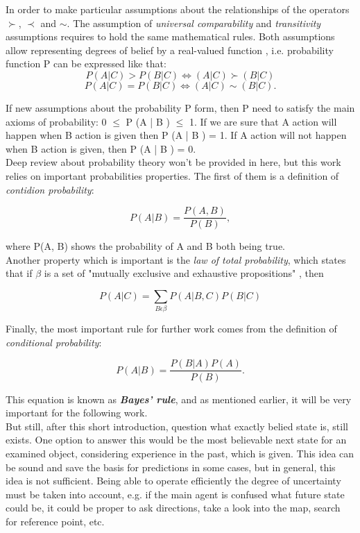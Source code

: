 In order to make particular assumptions about the relationships of the operators $\succ$, $\prec$ and $\sim$. The assumption of \textit{universal comparability} and \textit{transitivity} assumptions requires to hold the same mathematical rules. Both assumptions allow representing degrees of belief by a real-valued function \cite{BOOK}, i.e. probability function P can be expressed like that:
\[ P(A|C) > P(B|C) \iff (A|C) \succ (B|C) \]
\[P(A|C) = P(B|C) \iff (A|C) \sim (B|C). \]

If new assumptions about the probability P form, then P need to satisfy the main axioms of probability: 0 $\leqslant$ P (A | B ) $\leqslant$ 1. If we are sure that A action will happen when B action is given then P (A | B ) = 1. If A action will not happen when B action is given, then
P (A | B ) = 0. \\

Deep review about probability theory won't be provided in here, but this work relies on important probabilities properties. The first of them is a definition of \textit{contidion probability}:

\begin{equation}
P(A|B)=\frac{P(A,B)}{P(B)},
\end{equation}

where P(A, B) shows the probability of A and B both being true. \\

Another property which is important is the \textit{law of total probability}, which states that if $\beta$ is a set of "mutually exclusive and exhaustive propositions" \cite{BOOK}, then

\begin{equation}
P(A|C)=\displaystyle \sum_{B \epsilon \beta}{P(A|B,C)P(B|C)}
\end{equation}

Finally, the most important rule for further work comes from the definition of \textit{conditional probability}:

\begin{equation}
P(A|B)=\frac{P(B|A)P(A)}{P(B)}.
\end{equation}

This equation is known as \textbf{\textit{Bayes’ rule}}, and as mentioned earlier, it will be very important for the following work. \\

But still, after this short introduction, question what exactly belied state is, still exists. One option to answer this would be the most believable next state for an examined object, considering experience in the past, which is given. This idea can be sound and save the basis for predictions in some cases, but in general, this idea is not sufficient. Being able to operate efficiently the degree of uncertainty must be taken into account, e.g. if the main agent is confused what future state could be, it could be proper to ask directions, take a look into the map, search for reference point, etc. \\

